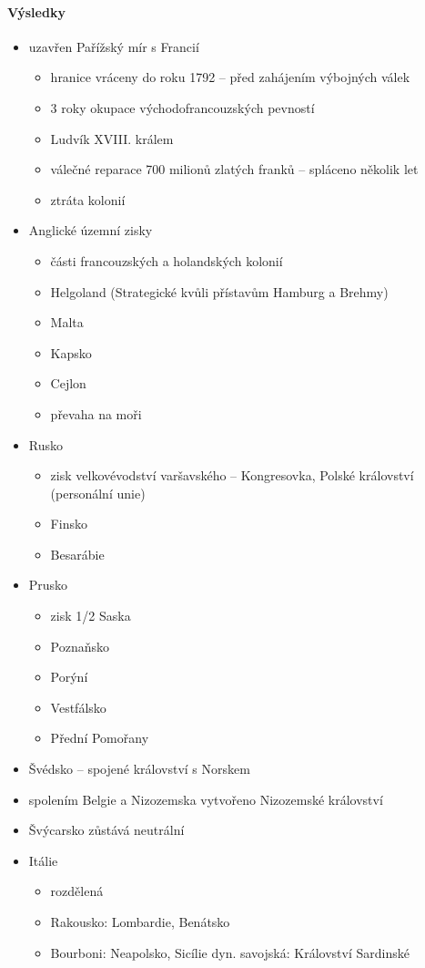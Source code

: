 \paragraph{Výsledky}
\begin{itemize}
\item uzavřen Pařížský mír s Francií
	\begin{itemize}
	\item hranice vráceny do roku 1792 -- před zahájením výbojných válek
	\item 3 roky okupace východofrancouzských pevností
	\item Ludvík XVIII. králem
	\item válečné reparace 700 milionů zlatých franků -- spláceno několik let
	\item ztráta kolonií
	\end{itemize}
\item Anglické územní zisky
	\begin{itemize}
	\item části francouzských a holandských kolonií
	\item Helgoland (Strategické kvůli přístavům Hamburg a Brehmy)
	\item Malta
	\item Kapsko
	\item Cejlon
	\item[\ra] převaha na moři
	\end{itemize}
\item Rusko
	\begin{itemize}
	\item zisk velkovévodství varšavského -- Kongresovka, Polské království (personální unie)
	\item Finsko
	\item Besarábie
	\end{itemize}
\item Prusko
	\begin{itemize}
	\item zisk 1/2 Saska
	\item Poznaňsko
	\item Porýní
	\item Vestfálsko
	\item Přední Pomořany
	\end{itemize}
\item Švédsko -- spojené království s Norskem
\item spolením Belgie a Nizozemska vytvořeno Nizozemské království
\item Švýcarsko zůstává neutrální
\item Itálie
	\begin{itemize}
	\item rozdělená
	\item Rakousko: Lombardie, Benátsko
	\item Bourboni: Neapolsko, Sicílie
	\iten dyn. savojská: Království Sardinské
	\end{itemize}
\end{itemize}

\newpage
\timeline


